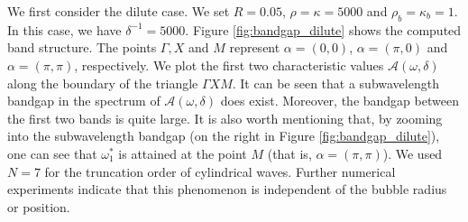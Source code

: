 \documentclass[11pt]{article}
\numberwithin{equation}{section}
\newcommand\1{{\ensuremath {\mathds 1} }}
\begin{document}
{{We first consider the dilute case. We set $R=0.05$, $\rho=\kappa=5000$ and $\rho_b=\kappa_b=1$. In this case, we have $\delta^{-1}=5000$. Figure \ref{fig:bandgap_dilute} shows the computed band structure. The points $\Gamma, X$ and $M$ represent $\alpha=(0,0)$, $\alpha=(\pi,0)$ and $\alpha=(\pi,\pi)$, respectively.  We plot the first two characteristic values $\mathcal{A}(\omega, \delta)$ along the boundary of the triangle $\Gamma X M$. It can be seen that  a subwavelength bandgap in the spectrum of $\mathcal{A}(\omega, \delta)$ does exist.  Moreover, the bandgap between the first two bands is quite large. It is also worth mentioning that, by zooming into the subwavelength bandgap (on the right in Figure \ref{fig:bandgap_dilute}), one can see that $\omega_1^\ast$ is attained at the point $M$ (that is, $\alpha=(\pi,\pi)$). We used $N=7$ for the truncation order of cylindrical waves. Further numerical experiments indicate that this phenomenon is independent of the bubble radius or position.   

}}
\end{document}
